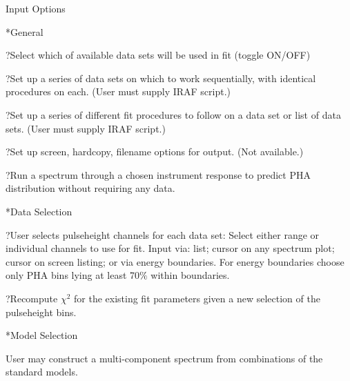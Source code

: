 \@{Input Options}

\**General

\??Select which of available data sets will be used in fit (toggle ON/OFF)

\??Set  up a series of data sets on which to work sequentially, with
identical procedures on each. (User must supply IRAF script.)

\??Set up a series of different fit procedures to follow on a data set or 
list of data sets. (User must supply IRAF script.)

\??Set up screen, hardcopy, filename options for output. (Not available.)

\??Run a spectrum through a chosen instrument response to predict PHA 
distribution without requiring any data.

\**Data Selection

\??User selects pulseheight channels for each data set: Select either range or individual
channels to use for fit.  Input via:  list; cursor on any spectrum plot; cursor
on screen listing; or via energy boundaries.  For energy boundaries choose only
PHA bins lying at least 70$\%$ within boundaries.

\??Recompute $\chi^{2}$ for the existing fit parameters given a new
selection of the pulseheight bins.

\**Model Selection

{\list


User may construct a multi-component spectrum from combinations of
the standard models.


}

{\parindent \vbox{}}

